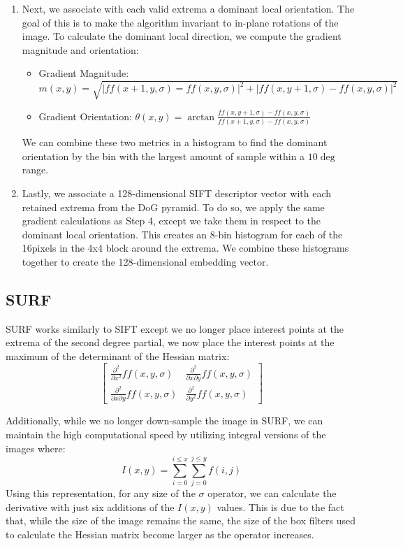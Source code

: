 \documentclass{article}
\begin{document}
\begin{enumerate}
    \item Next, we associate with each valid extrema a dominant local orientation. The goal of this is to make the algorithm invariant to in-plane rotations of the image. To calculate the dominant local direction, we compute the gradient magnitude and orientation:
    \begin{itemize}
        \item Gradient Magnitude: \(m(x,y) = \sqrt{|ff(x+1,y,\sigma)=ff(x,y,\sigma)|^2 + |ff(x,y+1,\sigma)-ff(x,y,\sigma)|^2}\)
        \item Gradient Orientation: \(\theta(x,y) = \arctan \frac{ff(x,y+1,\sigma) - ff(x,y,\sigma)}{ff(x+1,y,\sigma) - ff(x,y,\sigma)}\)
    \end{itemize}
    We can combine these two metrics in a histogram to find the dominant orientation by the bin with the largest amount of sample within a $10\deg$ range.
    \item Lastly, we associate a 128-dimensional SIFT descriptor vector with each retained extrema from the DoG pyramid. To do so, we apply the same gradient calculations as Step 4, except we take them in respect to the dominant local orientation. This creates an 8-bin histogram for each of the 16pixels in the 4x4 block around the extrema. We combine these histograms together to create the 128-dimensional embedding vector.
\end{enumerate}

\subsection{SURF}
SURF works similarly to SIFT except we no longer place interest points at the extrema of the second degree partial, we now place the interest points at the maximum of the determinant of the Hessian matrix:
\[\begin{bmatrix}
    \frac{\partial^2}{\partial x^2}ff(x, y, \sigma) & \frac{\partial^2}{\partial x \partial y}ff(x, y, \sigma) \\
    \frac{\partial^2}{\partial x \partial y}ff(x, y, \sigma) & \frac{\partial^2}{\partial y^2}ff(x, y, \sigma)
\end{bmatrix}\]

Additionally, while we no longer down-sample the image in SURF, we can maintain the high computational speed by utilizing integral versions of the images where:
\[I(x,y) = \sum_{i=0}^{i\leq x} \sum_{j=0}^{j\leq y} f(i,j)\]
Using this representation, for any size of the $\sigma$ operator, we can calculate the derivative with just six additions of the $I(x,y)$ values. This is due to the fact that, while the size of the image remains the same, the size of the box filters used to calculate the Hessian matrix become larger as the operator increases. 
\end{document}
